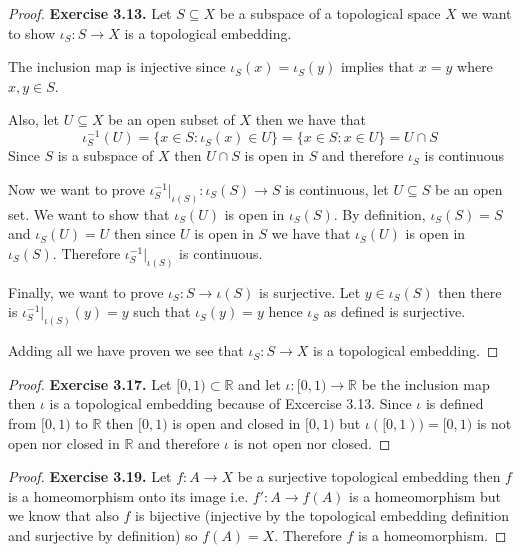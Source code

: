 \documentclass[11pt]{article}
\newcommand{\R}{\mathbb{R}}
\theoremstyle{definition}
\begin{document}
\begin{proof}{\textbf{Exercise 3.13.}}
    Let $S \subseteq X$ be a subspace of a topological space $X$ we want to
    show $\iota_S: S \to X$ is a topological embedding.

    The inclusion map is injective since $\iota_S(x) = \iota_S(y)$ implies that
    $x = y$ where $x,y \in S$.

    Also, let $U \subseteq X$ be an open subset of $X$ then we have that
    $$\iota_S^{-1}(U) = \{x \in S: \iota_S(x) \in U\} = \{x \in S: x \in U\} = U \cap S$$
    Since $S$ is a subspace of $X$ then $U \cap S$ is open in $S$ and therefore
    $\iota_S$ is continuous

    Now we want to prove $\iota_S^{-1}|_{\iota(S)}:\iota_S(S) \to S$ is continuous,
    let $U\subseteq S$ be an open set.
    We want to show that $\iota_S(U)$ is open in $\iota_S(S)$.
    By definition, $\iota_S(S) = S$ and $\iota_S(U) = U$ then since $U$
    is open in $S$ we have that $\iota_S(U)$ is open in $\iota_S(S)$.
    Therefore $\iota_S^{-1}|_{\iota(S)}$ is continuous.

    Finally, we want to prove $\iota_S: S \to \iota(S)$ is surjective.
    Let $y \in \iota_S(S)$ then there is $\iota_S^{-1}|_{\iota(S)}(y) = y$
    such that $\iota_S(y) = y$ hence $\iota_S$ as defined is surjective.

    Adding all we have proven we see that $\iota_S: S \to X$ is a topological
    embedding.
\end{proof}
\begin{proof}{\textbf{Exercise 3.17.}}
    Let $[0,1) \subset \R$ and let $\iota:[0,1) \to \R$ be the inclusion map
    then $\iota$ is a topological embedding because of Excercise 3.13.
    Since $\iota$ is defined from $[0,1)$ to $\R$ then $[0,1)$ is open and
    closed in $[0,1)$ but $\iota([0,1)) = [0,1)$ is not open nor closed in $\R$
    and therefore $\iota$ is not open nor closed.
\end{proof}
\begin{proof}{\textbf{Exercise 3.19.}}
    Let $f: A \to X$ be a surjective topological embedding then $f$ is a
    homeomorphism onto its image i.e. $f': A  \to f(A)$ is a homeomorphism 
    but we know that also $f$ is bijective (injective by the topological
    embedding definition and surjective by definition) so $f(A) = X$.
    Therefore $f$ is a homeomorphism.
\end{proof}
\cleardoublepage
\end{document}
